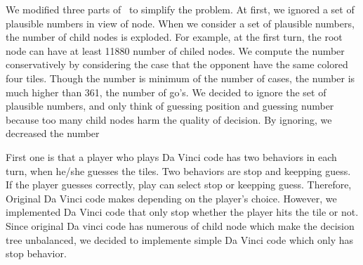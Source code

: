 

We modified three parts of \md~to simplify the problem.
At first, we ignored a set of plausible numbers in view of node.
When we consider a set of plausible numbers, the number of child nodes is exploded.
For example, at the first turn, the root node can have at least 11880 number of chiled nodes.
We compute the number conservatively by considering the case that the opponent have the same colored four tiles.
Though the number is minimum of the number of cases, the number is much higher than 361, the number of go's.
We decided to ignore the set of plausible numbers, and only think of guessing position and guessing number because too many child nodes harm the quality of decision.
By ignoring, we decreased the number

First one is that a player who plays Da Vinci code has two behaviors in each turn, when he/she guesses the tiles. 
Two behaviors are stop and keepping guess.
If the player guesses correctly, play can select stop or keepping guess. 
Therefore, Original Da Vinci code makes depending on the player's choice. 
However, we implemented Da Vinci code that only stop whether the player hits the tile or not. 
Since original Da vinci code has numerous of child node which make the decision tree unbalanced, we decided to implemente simple Da Vinci code which only has stop behavior.
 
